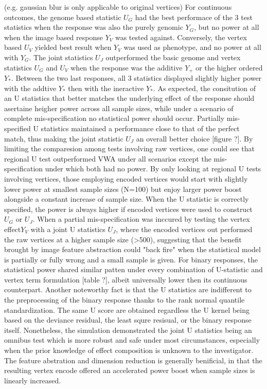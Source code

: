 \documentclass[twocolumn]{article}
\begin{document}
 (e.g. gaussian blur is only applicable to original vertices)         
For continuous outcomes, the genome based statistic $U_G$ had the best performace of the 3 test statistics when the response was also the purely genomic $Y_G$, but no power at all when the image based response $Y_V$ was tested against. Conversely, the vertex based $U_V$ yielded best result when $Y_V$ was used as phenotype, and no power at all with $Y_G$. The joint statistics $U_J$ outperformed the basic genome and vertex statistics $U_G$ and $U_V$ when the response was the additive $Y_+$ or the higher ordered $Y_*$. Between the two last responses, all 3 statistics displayed slightly higher power with the addtive $Y_*$ then with the ineractive $Y_*$. As expected, the consitution of an U statistics that better matches the underlying effect of the response should asertaine heigher power across all sample sizes, while under a scenario of complete mis-specification no statistical power should occur. Partially mis-specified U statistics maintained a performance close to that of the perfect match, thus making the joint statistic $U_J$ an overall better choice [figure ?]. 
By limiting the comparesion among tests involving raw vertices, one could see that regional U test outperformed VWA under all scenarios except the mis-specification under which both had no power. By only looking at regional U tests involving vertices, those employing encoded vertices would start with slightly lower power at smallest sample sizes (N=100) but enjoy larger power boost alongside a constant increase of sample size. When the U statistic is correctly specified, the power is always higher if encoded vertices were used to construct $U_G$ or $U_J$. When a partial mis-specification was inccured by testing the vertex effect$Y_V$ with a joint U statistics $U_J$, where the encoded vertices out performed the raw vertices at a higher sample size (>500), suggesting that the benefit brought by image feature abstraction could "back fire" when the statistical model is partially or fully wrong and a small sample is given. 
For binary responses, the statistical power shared similar patten under every combination of U-statistic and vertex term formulation [table ?], albeit universally lower then its continuous counterpart. Another noteworthy fact is that the U statistics are indifferent to the preprocessing of the binary response thanks to the rank normal quantile standardization. The same U score are obtained regardless the U kernel being based on the deviance residual, the least squre resisual, or the binary response itself.
Nonetheless, the simulation demonstrated the joint U statistics being an omnibus test which is more robust and safe under most circumstances, especially when the prior knowledge of effect composition is unknown to the investigator. The feature abstration and dimension reduction is generally benificial, in that the resulting vertex encode offered an accelerated power boost when sample sizes is linearly increased.
\end{document}
